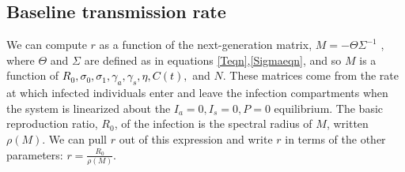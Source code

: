 \documentclass[10pt,onecolumn,twoside,lineno]{pnas-new}
\begin{document}
\subsection*{Baseline transmission rate} 

We can compute $r$ as a function of the next-generation matrix, $M = - \Theta \Sigma ^{-1}$  \cite{diekmann2010construction}, where $\Theta$ and $\Sigma$ are defined as in equations \ref{Teqn},\ref{Sigmaeqn}, and so $M$ is a function of \textcolor{black}{ $R_0, \sigma_0,\sigma_1, \gamma_a, \gamma_s, \eta, C(t),$} and $N$. These matrices come from the rate at which infected individuals enter and leave the  infection compartments when the system is linearized about the $I_a = 0, I_s = 0, P = 0$ equilibrium. The basic reproduction ratio, $R_0$, of the infection is the spectral radius of $M$, written $\rho(M)$. We can pull $r$ out of this expression and write $r$ in terms of the other parameters: $r = \frac{R_0}{\rho(M)}$.
\footnotesize
\end{document}
